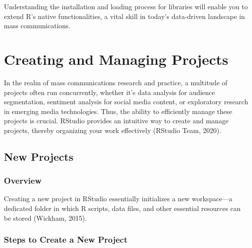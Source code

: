 \documentclass[
  b5paper]{book}
\begin{document}
Understanding the installation and loading process for libraries will enable you to extend R's native functionalities, a vital skill in today's data-driven landscape in mass communications.

\hypertarget{creating-and-managing-projects}{%
\section{Creating and Managing Projects}\label{creating-and-managing-projects}}

In the realm of mass communications research and practice, a multitude of projects often run concurrently, whether it's data analysis for audience segmentation, sentiment analysis for social media content, or exploratory research in emerging media technologies. Thus, the ability to efficiently manage these projects is crucial. RStudio provides an intuitive way to create and manage projects, thereby organizing your work effectively (RStudio Team, 2020).

\hypertarget{new-projects}{%
\subsection*{New Projects}\label{new-projects}}

\hypertarget{overview-8}{%
\subsubsection*{Overview}\label{overview-8}}

Creating a new project in RStudio essentially initializes a new workspace---a dedicated folder in which R scripts, data files, and other essential resources can be stored (Wickham, 2015).

\hypertarget{steps-to-create-a-new-project}{%
\subsubsection*{Steps to Create a New Project}\label{steps-to-create-a-new-project}}
\end{document}
